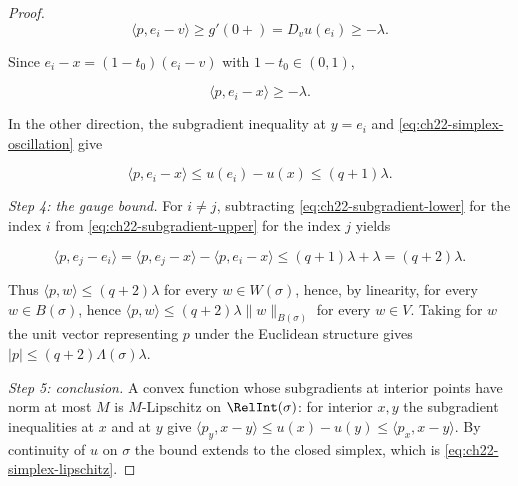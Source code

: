 \begin{proof}
\[
 \langle p,e_i-v\rangle\geq g'(0+)=D_vu(e_i)\geq-\lambda .
\]

Since $e_i-x=(1-t_0)(e_i-v)$ with $1-t_0\in(0,1)$,

\[
 \langle p,e_i-x\rangle\geq-\lambda .
\tag{22.15}\label{eq:ch22-subgradient-lower}
\]

In the other direction, the subgradient inequality at $y=e_i$ and
\eqref{eq:ch22-simplex-oscillation} give

\[
 \langle p,e_i-x\rangle\leq u(e_i)-u(x)\leq(q+1)\lambda .
\tag{22.16}\label{eq:ch22-subgradient-upper}
\]

\emph{Step 4: the gauge bound.}  For $i\neq j$, subtracting
\eqref{eq:ch22-subgradient-lower} for the index $i$ from
\eqref{eq:ch22-subgradient-upper} for the index $j$ yields

\[
 \langle p,e_j-e_i\rangle
   =\langle p,e_j-x\rangle-\langle p,e_i-x\rangle
   \leq(q+1)\lambda+\lambda=(q+2)\lambda .
\tag{22.17}\label{eq:ch22-subgradient-edges}
\]

Thus $\langle p,w\rangle\leq(q+2)\lambda$ for every $w\in W(\sigma)$,
hence, by linearity, for every $w\in B(\sigma)$, hence
$\langle p,w\rangle\leq(q+2)\lambda\|w\|_{B(\sigma)}$ for every
$w\in V$.  Taking for $w$ the unit vector representing $p$ under the
Euclidean structure gives
$|p|\leq(q+2)\Lambda(\sigma)\lambda$.

\emph{Step 5: conclusion.}  A convex function whose subgradients at interior
points have norm at most $M$ is $M$-Lipschitz on $\RelInt(\sigma)$:
for interior $x,y$ the subgradient inequalities at $x$ and at $y$ give
$\langle p_y,x-y\rangle\leq u(x)-u(y)\leq\langle p_x,x-y\rangle$.  By
continuity of $u$ on $\sigma$ the bound extends to the closed simplex,
which is \eqref{eq:ch22-simplex-lipschitz}.
\end{proof}

